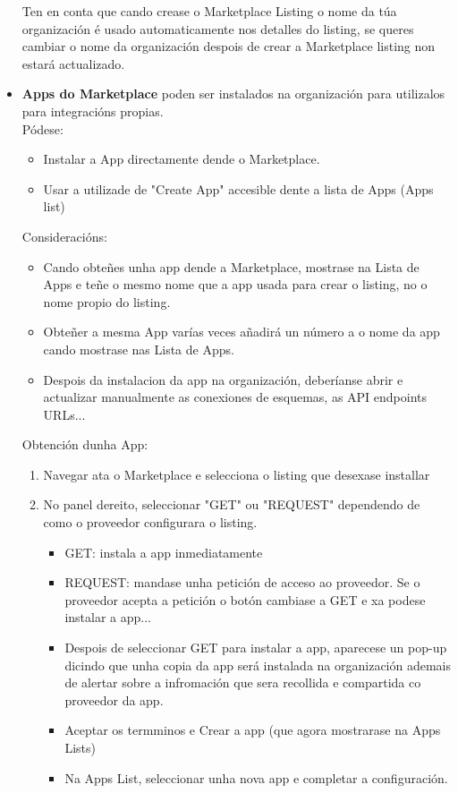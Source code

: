 \begin{flushleft}
\begin{itemize}
\begin{enumerate}
    \end{enumerate}
    Ten en conta que cando crease o Marketplace Listing o nome da túa organización é usado automaticamente nos detalles do listing, se queres cambiar o nome da organización despois de crear a Marketplace listing non estará actualizado.
    \item \textbf{Apps do Marketplace }poden ser instalados na organización para utilizalos para integracións propias.\\ Pódese: \begin{itemize}
        \item Instalar a App directamente dende o Marketplace.
        \item Usar a utilizade de "Create App" accesible dente a lista de Apps (Apps list)
    \end{itemize}
    Consideracións:
    \begin{itemize}
        \item Cando obteñes unha app dende a Marketplace, mostrase na Lista de Apps e teñe o mesmo nome que a app usada para crear o listing, no o nome propio do listing.
        \item Obteñer a mesma App varías veces añadirá un número a o nome da app cando mostrase nas Lista de Apps.
        \item Despois da instalacion da app na organización, deberíanse abrir e actualizar manualmente as conexiones de esquemas, as API endpoints URLs...
    \end{itemize}
    Obtención dunha App:
    \begin{enumerate}
        \item Navegar ata o Marketplace e  selecciona o listing que desexase installar
        \item No panel dereito, seleccionar "GET" ou "REQUEST" dependendo de como o proveedor configurara o listing. \begin{itemize}
            \item GET: instala a app inmediatamente
            \item REQUEST: mandase unha petición de acceso ao proveedor. Se o proveedor acepta a petición o botón cambiase a GET e xa podese instalar a app...
            \item Despois de seleccionar GET para instalar a app, aparecese un pop-up dicindo que unha copia da app será instalada na organización ademais de alertar sobre a infromación que sera recollida e compartida co proveedor da app.
            \item Aceptar os termminos e Crear a app (que agora mostrarase na Apps Lists)
            \item Na Apps List, seleccionar unha nova app  e completar a configuración.
        \end{itemize}
    \end{enumerate}
\end{itemize}
\end{flushleft}
